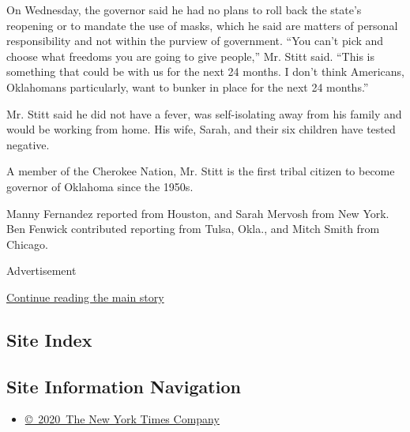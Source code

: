 On Wednesday, the governor said he had no plans to roll back the state's
reopening or to mandate the use of masks, which he said are matters of
personal responsibility and not within the purview of government. ``You
can't pick and choose what freedoms you are going to give people,'' Mr.
Stitt said. ``This is something that could be with us for the next 24
months. I don't think Americans, Oklahomans particularly, want to bunker
in place for the next 24 months.''

Mr. Stitt said he did not have a fever, was self-isolating away from his
family and would be working from home. His wife, Sarah, and their six
children have tested negative.

A member of the Cherokee Nation, Mr. Stitt is the first tribal citizen
to become governor of Oklahoma since the 1950s.

Manny Fernandez reported from Houston, and Sarah Mervosh from New York.
Ben Fenwick contributed reporting from Tulsa, Okla., and Mitch Smith
from Chicago.

Advertisement

\protect\hyperlink{after-bottom}{Continue reading the main story}

\hypertarget{site-index}{%
\subsection{Site Index}\label{site-index}}

\hypertarget{site-information-navigation}{%
\subsection{Site Information
Navigation}\label{site-information-navigation}}

\begin{itemize}
\tightlist
\item
  \href{https://help.nytimes3xbfgragh.onion/hc/en-us/articles/115014792127-Copyright-notice}{©~2020~The
  New York Times Company}
\end{itemize}

